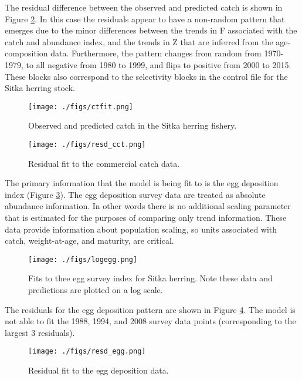 \documentclass[12pt,letterpaper]{article}
\begin{document}
  The residual difference between the observed and predicted catch is shown in Figure \ref{fig:resd_cct}.  In this case the residuals appear to have a non-random pattern that emerges due to the minor differences between the trends in F associated with the catch and abundance index, and the trends in Z that are inferred from the age-composition data.  Furthermore, the pattern changes from random from 1970-1979, to all negative from 1980 to 1999, and flips to positive from 2000 to 2015.  These blocks also correspond to the selectivity blocks in the control file for the Sitka herring stock.

  \begin{figure}[tb]
    \centering
    \texttt{[image: ./figs/ctfit.png]}
    \caption{Observed and predicted catch in the Sitka herring fishery.}
    \label{fig:ctfit}
  \end{figure}

  \begin{figure}[tb]
    \centering
    \texttt{[image: ./figs/resd\_cct.png]}
    \caption{Residual fit to the commercial catch data.}
    \label{fig:resd_cct}
  \end{figure}

  The primary information that the model is being fit to is the egg deposition index (Figure \ref{fig:logegg}).  The egg deposition survey data are treated as absolute abundance information.  In other words there is no additional scaling parameter that is estimated for the purposes of comparing only trend information.  These data provide information about population scaling, so units associated with catch, weight-at-age, and maturity, are critical.

  \begin{figure}[tb]
    \centering
    \texttt{[image: ./figs/logegg.png]}
    \caption{Fits to thee egg survey index for Sitka herring. Note these data and predictions are plotted on a log scale.}
    \label{fig:logegg}
  \end{figure}

  The residuals for the egg deposition pattern are shown in Figure \ref{fig:resd_egg}.  The model is not able to fit the 1988, 1994, and 2008 survey data points (corresponding to the largest 3 residuals).

  \begin{figure}[tb]
    \centering
    \texttt{[image: ./figs/resd\_egg.png]}
    \caption{Residual fit to the egg deposition data.}
    \label{fig:resd_egg}
  \end{figure}
\end{document}
